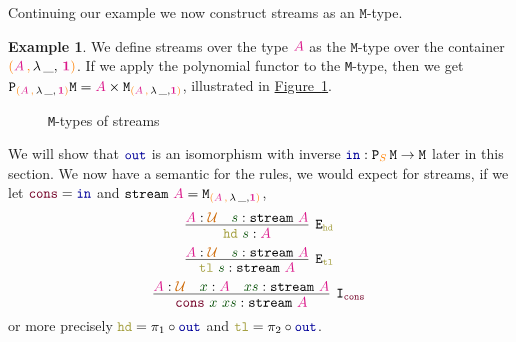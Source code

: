 \documentclass[twoside,11pt,openright]{report}
\theoremstyle{plain} %
\theoremstyle{definition}
\newtheorem{exmp}{Example} %
\theoremstyle{remark}
\newcommand*{\figref}[1]{\hyperref[fig:#1]{Figure~\ref*{fig:#1}}}
\newcommand*{\term}[1]{\textcolor{green!30!black}{#1}} %
\newcommand*{\type}[1]{\textcolor{magenta!90!black}{#1}}
\newcommand*{\container}[1]{\textcolor{orange}{#1}}
\newcommand*{\containerpair}[2]{\ensuremath{\colorlet{savedleftcolor}{.}\color{orange}\left(\color{savedleftcolor}#1\,\textcolor{orange}{\mathbf{,}}\,#2\color{orange}\right)\color{savedleftcolor}}}
\newcommand*{\containerpairsimple}[2]{\containerpair{#1}{\lambda\,\_,\,#2}}
\newcommand*{\universe}[1]{\textcolor{orange!80!black}{#1}}
\newcommand*{\unit}{\type{\textbf{1}}}
\newcommand*{\function}[1]{\textcolor{blue!60!black}{\ensuremath{\mathtt{#1}}}}
\newcommand*{\constructor}[1]{\textcolor{purple!60!black}{\ensuremath{\mathtt{#1}}}}
\newcommand*{\destructor}[1]{\textcolor{yellow!60!black}{\ensuremath{\mathtt{#1}}}}
\newcommand*{\typeformer}[1]{\ensuremath{\mathtt{#1}}}
\newcommand*{\functor}[1]{\ensuremath{\mathbf{\mathtt{#1}}}}
\begin{document}
\noindent Continuing our example we now construct streams as an \(\mathtt{M}\)-type.
\begin{exmp}
  \label{exmp:stream-M-type-example}
  We define streams over the type \(\type{A}\) as the \(\mathtt{M}\)-type over the container \(\containerpairsimple{\type{A}}{\unit}\). If we apply the polynomial functor to the \texttt{M}-type, then we get \(\functor{P}_{\containerpairsimple{\type{A}}{\unit}} \typeformer{M} = \type{A} \times \typeformer{M}_{\containerpair{\type{A}}{\lambda\,\_,\unit}}\), illustrated in \figref{stream-M-type}.
  \begin{figure}[h]
    \centering
    \caption{\texttt{M}-types of streams}
    \label{fig:stream-M-type}
  \end{figure}
  We will show that \(\function{out}\) is an isomorphism with inverse \(\function{in} : \functor{P}_{\container{S}}\,\typeformer{M} \rightarrow \typeformer{M}\) later in this section. We now have a semantic for the rules, we would expect for streams, if we let \(\constructor{cons} = \function{in}\) and \(\typeformer{stream}~\type{A} = \typeformer{M}_{\containerpair{\type{A}}{\lambda\,\_,\unit}}\),
  \begin{equation}
    \vcenter{\infer[\mathtt{E}_{\destructor{hd}}]{\destructor{hd}~\term{s} : \type{A}}{\type{A} : \universe{\mathcal{U}} & \term{s} : \typeformer{stream}~\type{A}}}
  \end{equation}
  \begin{equation}
    \vcenter{\infer[\mathtt{E}_{\destructor{tl}}]{\destructor{tl}~\term{s} : \typeformer{stream}~\type{A}}{\type{A} : \universe{\mathcal{U}} & \term{s} : \typeformer{stream}~\type{A}}}
  \end{equation}
  \begin{equation}
    \vcenter{\infer[\mathtt{I}_{\constructor{cons}}]{\term{\constructor{cons}}~\term{x}~\term{xs} : \typeformer{stream}~\type{A}}{\type{A} : \universe{\mathcal{U}} & \term{x} : \type{A} & \term{xs} : \typeformer{stream}~\type{A}}}
  \end{equation}
  or more precisely \(\destructor{hd} = \pi_1 \circ \function{out}\) and \(\destructor{tl} = \pi_2 \circ \function{out}\).
\end{exmp}
\end{document}
